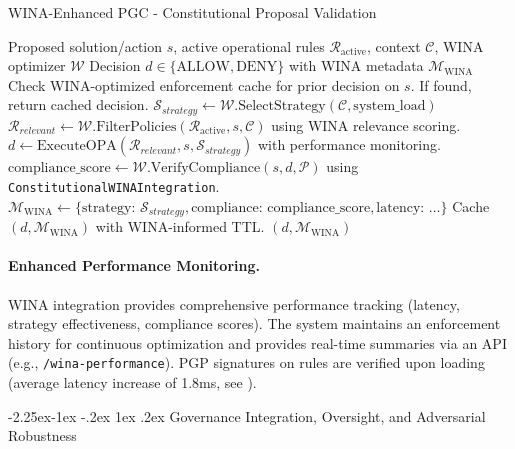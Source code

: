 \documentclass[manuscript,screen,review,anonymous,9pt]{acmart}
\makeatletter
\renewcommand\subsection{\@startsection{subsection}{2}{\z@}%
  {-2.25ex\@plus -1ex \@minus -.2ex}%
  {1ex \@plus .2ex}%
  {\normalfont\large\bfseries}}
\makeatother
\begin{document}
\begin{algorithm}[!htbp]
\caption{WINA-Enhanced PGC - Constitutional Proposal Validation}
\label{alg:wina_pgc_validation}
\begin{algorithmic}[1]
\Require Proposed solution/action $s$, active operational rules $\mathcal{R}_{\text{active}}$, context $\mathcal{C}$, WINA optimizer $\mathcal{W}$
\Ensure Decision $d \in \{\text{ALLOW}, \text{DENY}\}$ with WINA metadata $\mathcal{M}_{\text{WINA}}$
    \State Check WINA-optimized enforcement cache for prior decision on $s$. If found, return cached decision.
    \State $\mathcal{S}_{strategy} \gets \mathcal{W}.\text{SelectStrategy}(\mathcal{C}, \text{system\_load})$ 
    \State $\mathcal{R}_{relevant} \gets \mathcal{W}.\text{FilterPolicies}(\mathcal{R}_{\text{active}}, s, \mathcal{C})$ using WINA relevance scoring.
    \State $d \gets \text{ExecuteOPA}(\mathcal{R}_{relevant}, s, \mathcal{S}_{strategy})$ with performance monitoring.
    \State $\text{compliance\_score} \gets \mathcal{W}.\text{VerifyCompliance}(s, d, \mathcal{P})$ using \texttt{ConstitutionalWINAIntegration}.
    \State $\mathcal{M}_{\text{WINA}} \gets \{\text{strategy: } \mathcal{S}_{strategy}, \text{compliance: } \text{compliance\_score}, \text{latency: } \dots \}$
    \State Cache $(d, \mathcal{M}_{\text{WINA}})$ with WINA-informed TTL.
    \State \Return $(d, \mathcal{M}_{\text{WINA}})$
\EndFunction
\end{algorithmic}
\end{algorithm}

\paragraph{Enhanced Performance Monitoring.} WINA integration provides comprehensive performance tracking (latency, strategy effectiveness, compliance scores). The system maintains an enforcement history for continuous optimization and provides real-time summaries via an API (e.g., \texttt{/wina-performance}). PGP signatures on rules are verified upon loading (average latency increase of 1.8ms, see ).

\subsection{Governance Integration, Oversight, and Adversarial Robustness}
\label{subsec:governance_integration_oversight_robustness} 
\end{document}
